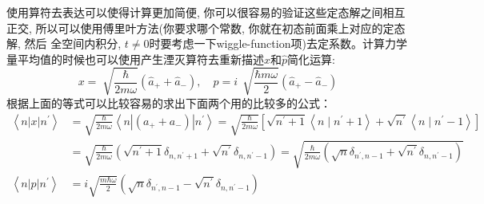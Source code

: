 \documentclass[a4paper,zihao=-4,linespread=1]{ctexrep}
\newenvironment{lequation}{\large\begin{equation}}{\end{equation}}
\begin{document}
    使用算符去表达可以使得计算更加简便, 你可以很容易的验证这些定态解之间相互正交, 所以可以使用傅里叶方法(你要求哪个常数, 你就在初态前面乘上对应的定态解, 然后
    全空间内积分, $t\neq0$时要考虑一下wiggle-function项)去定系数。计算力学量平均值的时候也可以使用产生湮灭算符去重新描述$x$和$\hat{p}$简化运算:
    \begin{lequation}
        \boxed{
            x =\sqrt[]{\frac{\hbar}{2m\omega}}\left(\hat{a}_++\hat{a}_-\right), \quad 
            p =i\,\sqrt[]{\frac{\hbar m \omega}{2}}\left(\hat{a}_+-\hat{a}_-\right)
        }
    \end{lequation}
    根据上面的等式可以比较容易的求出下面两个用的比较多的公式：
    \begin{align*}
        \left\langle n|x| n^{\prime}\right\rangle & =\sqrt{\frac{\hbar}{2 m \omega}}\left\langle n\left|\left(a_{+}+a_{-}\right)\right| n^{\prime}\right\rangle=\sqrt{\frac{\hbar}{2 m \omega}}\left[\sqrt{n^{\prime}+1}\left\langle n \mid n^{\prime}+1\right\rangle+\sqrt{n^{\prime}}\left\langle n \mid n^{\prime}-1\right\rangle\right] \\
        & =\sqrt{\frac{\hbar}{2 m \omega}}\left(\sqrt{n^{\prime}+1} \delta_{n, n^{\prime}+1}+\sqrt{n^{\prime}} \delta_{n, n^{\prime}-1}\right)=\boxed{\sqrt{\frac{\hbar}{2 m \omega}\left(\sqrt{n} \delta_{n^{\prime}, n-1}+\sqrt{n^{\prime}} \delta_{n, n^{\prime}-1}\right)} }\\
        \left\langle n|p| n^{\prime}\right\rangle & =\boxed{i \sqrt{\frac{m \hbar \omega}{2}}\left(\sqrt{n} \delta_{n^{\prime}, n-1}-\sqrt{n^{\prime}} \delta_{n, n^{\prime}-1}\right)}
    \end{align*}
\end{document}
